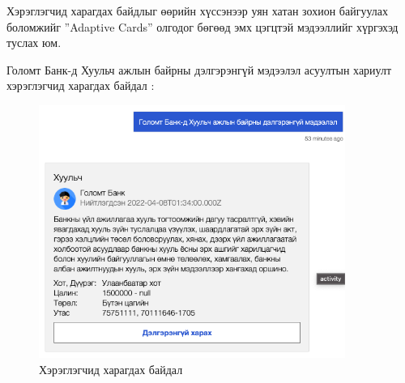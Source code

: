 
Хэрэглэгчид харагдах байдлыг өөрийн хүссэнээр уян хатан зохион байгуулах боломжийг ”Adaptive Cards” олгодог бөгөөд эмх цэгцтэй мэдээллийг хүргэхэд туслах юм.

\newpage
Голомт Банк-д Хуульч ажлын байрны дэлгэрэнгүй мэдээлэл асуултын хариулт хэрэглэгчид харагдах байдал :
\begin{figure}[ht]
  \centering
  \includegraphics[width=10cm]{images/userUI.png}
  \caption{Хэрэглэгчид харагдах байдал}\label{fig:userUI}
\end{figure}
